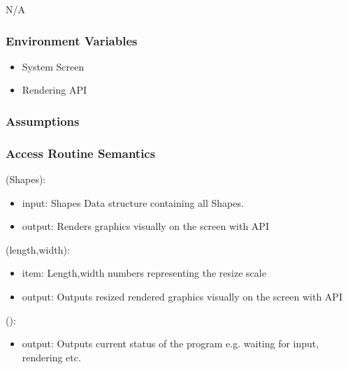 \documentclass[12pt, titlepage]{article}
\begin{document}
N/A

\subsubsection{Environment Variables}

\begin{itemize}
	\item System Screen
	\item Rendering API
\end{itemize}

\subsubsection{Assumptions}


\subsubsection{Access Routine Semantics}

(Shapes):
\begin{itemize}
\item input: Shapes Data structure containing all Shapes.
\item output: Renders graphics visually on the screen with API
\end{itemize}

(length,width):
\begin{itemize}
\item item: Length,width numbers representing the resize scale
\item output: Outputs resized rendered graphics visually on the screen with API
\end{itemize}

():
\begin{itemize}

\item output: Outputs current status of the program e.g. waiting for input, rendering etc.
\end{itemize}

\end{document}
